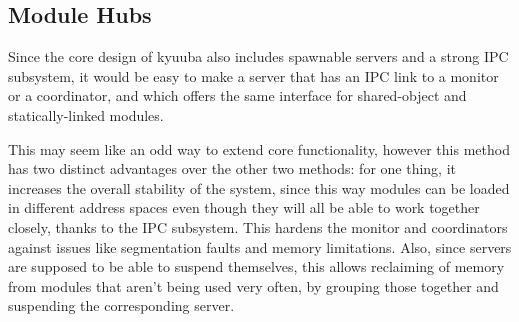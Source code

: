 \documentclass[a4paper,twoside,titlepage]{article}
\begin{document}
\subsection{Module Hubs}
Since the core design of kyuuba also includes spawnable servers and a strong IPC
subsystem, it would be easy to make a server that has an IPC link to a monitor
or a coordinator, and which offers the same interface for shared-object and
statically-linked modules.

This may seem like an odd way to extend core functionality, however this method
has two distinct advantages over the other two methods: for one thing, it
increases the overall stability of the system, since this way modules can be
loaded in different address spaces even though they will all be able to work
together closely, thanks to the IPC subsystem. This hardens the monitor and
coordinators against issues like segmentation faults and memory limitations.
Also, since servers are supposed to be able to suspend themselves, this allows
reclaiming of memory from modules that aren't being used very often, by grouping
those together and suspending the corresponding server.
\end{document}
